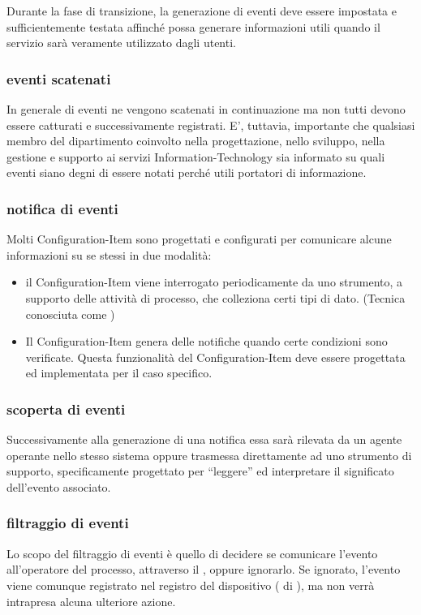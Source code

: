 Durante la fase di transizione, la generazione di eventi deve essere impostata e sufficientemente testata affinché possa generare informazioni utili quando il servizio sarà veramente utilizzato dagli utenti.

\subsubsection[Eventi scatenati]{eventi scatenati}
In generale di eventi ne vengono scatenati in continuazione ma non tutti devono essere catturati e successivamente registrati. E', tuttavia, importante che qualsiasi membro del dipartimento coinvolto nella progettazione, nello sviluppo, nella gestione e supporto ai servizi \acs{Information-Technology} sia informato su quali eventi siano degni di essere notati perché utili portatori di informazione.

\subsubsection[Notifica di eventi]{notifica di eventi}
Molti \ac{Configuration-Item} sono progettati e configurati per comunicare alcune informazioni su se stessi in due modalità:

\begin{itemize}
\item{il \ac{Configuration-Item} viene interrogato periodicamente da uno strumento, a supporto delle attività di processo, che colleziona certi tipi di dato. (Tecnica conosciuta come )}
\item{Il \ac{Configuration-Item} genera delle notifiche quando certe condizioni sono verificate. Questa funzionalità del \ac{Configuration-Item} deve essere progettata ed implementata per il caso specifico.}
\end{itemize}

\subsubsection[Scoperta di eventi]{scoperta di eventi}
Successivamente alla generazione di una notifica essa sarà rilevata da un agente operante nello stesso sistema oppure trasmessa direttamente ad uno strumento di supporto, specificamente progettato per ``leggere'' ed interpretare il significato dell'evento associato.

\subsubsection[Filtraggio di eventi]{filtraggio di eventi}
Lo scopo del filtraggio di eventi è quello di decidere se comunicare l'evento all'operatore del processo, attraverso il , oppure ignorarlo. Se ignorato, l'evento viene comunque registrato nel registro del dispositivo ( di ), ma non verrà intrapresa alcuna ulteriore azione.

